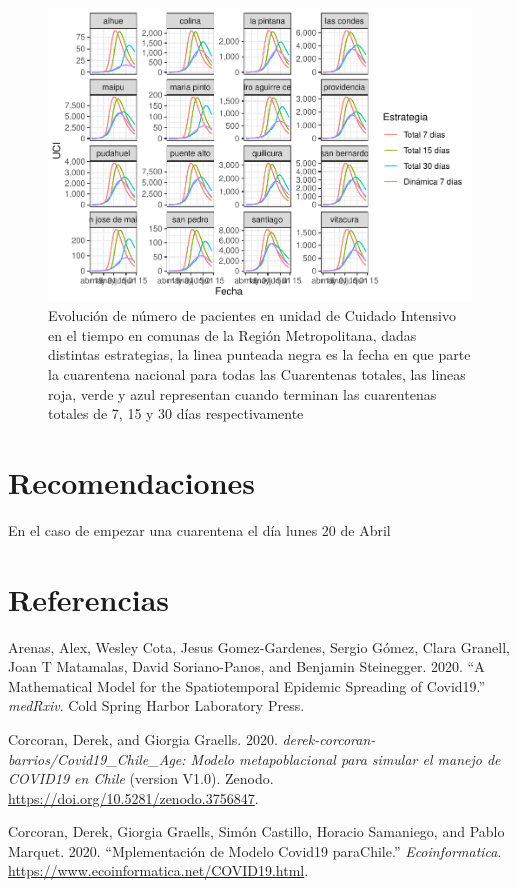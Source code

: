 \documentclass[]{article}
\begin{document}
\begin{figure}
\centering
\includegraphics{Informe_Mesa_2020_04_16_files/figure-latex/UCIComunal-1.pdf}
\caption{\label{fig:UCIComunal}Evolución de número de pacientes en unidad de Cuidado Intensivo en el tiempo en comunas de la Región Metropolitana, dadas distintas estrategias, la linea punteada negra es la fecha en que parte la cuarentena nacional para todas las Cuarentenas totales, las lineas roja, verde y azul representan cuando terminan las cuarentenas totales de 7, 15 y 30 días respectivamente}
\end{figure}

\hypertarget{recomendaciones}{%
\section{Recomendaciones}\label{recomendaciones}}

En el caso de empezar una cuarentena el día lunes 20 de Abril

\hypertarget{referencias}{%
\section*{Referencias}\label{referencias}}

\hypertarget{refs}{}
\leavevmode\hypertarget{ref-arenas2020mathematical}{}%
Arenas, Alex, Wesley Cota, Jesus Gomez-Gardenes, Sergio Gómez, Clara Granell, Joan T Matamalas, David Soriano-Panos, and Benjamin Steinegger. 2020. ``A Mathematical Model for the Spatiotemporal Epidemic Spreading of Covid19.'' \emph{medRxiv}. Cold Spring Harbor Laboratory Press.

\leavevmode\hypertarget{ref-derek_corcoran_barrios_2020_3756847}{}%
Corcoran, Derek, and Giorgia Graells. 2020. \emph{derek-corcoran-barrios/Covid19\_Chile\_Age: Modelo metapoblacional para simular el manejo de COVID19 en Chile} (version V1.0). Zenodo. \url{https://doi.org/10.5281/zenodo.3756847}.

\leavevmode\hypertarget{ref-corcoran_graells_2020}{}%
Corcoran, Derek, Giorgia Graells, Simón Castillo, Horacio Samaniego, and Pablo Marquet. 2020. ``Mplementación de Modelo Covid19 paraChile.'' \emph{Ecoinformatica}. \url{https://www.ecoinformatica.net/COVID19.html}.
\end{document}
